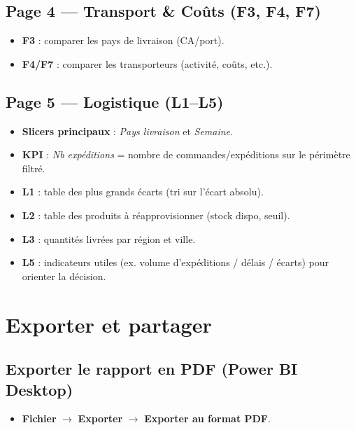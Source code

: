 \documentclass[a4paper,12pt]{article}
\begin{document}
\subsection*{Page 4 — Transport \& Coûts (F3, F4, F7)}
\begin{itemize}[leftmargin=*]
  \item \textbf{F3} : comparer les pays de livraison (CA/port).
  \item \textbf{F4/F7} : comparer les transporteurs (activité, coûts, etc.).
\end{itemize}

\subsection*{Page 5 — Logistique (L1–L5)}
\begin{itemize}[leftmargin=*]
  \item \textbf{Slicers principaux} : \textit{Pays livraison} et \textit{Semaine}.
  \item \textbf{KPI} : \textit{Nb expéditions} = nombre de commandes/expéditions sur le périmètre filtré.
  \item \textbf{L1} : table des plus grands écarts (tri sur l’écart absolu).
  \item \textbf{L2} : table des produits à réapprovisionner (stock dispo, seuil).
  \item \textbf{L3} : quantités livrées par région et ville.
  \item \textbf{L5} : indicateurs utiles (ex. volume d’expéditions / délais / écarts) pour orienter la décision.
\end{itemize}

\section{Exporter et partager}

\subsection{Exporter le rapport en PDF (Power BI Desktop)}
\begin{itemize}[leftmargin=*]
  \item \textbf{Fichier} $\rightarrow$ \textbf{Exporter} $\rightarrow$ \textbf{Exporter au format PDF}.
\end{itemize}
\end{document}
